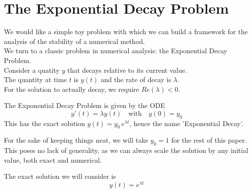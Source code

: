 \section{The Exponential Decay Problem}

\par We would like a simple toy problem with which we can build a framework for the analysis of the stability of a numerical method.\\
We turn to a classic problem in numerical analysis: the Exponential Decay Problem.\\
Consider a quatity $y$ that decays relative to its current value.\\
The quantity at time $t$ is $y(t)$ and the rate of decay is $\lambda$.\\
For the solution to actually decay, we require $Re(\lambda) < 0$.\\

\par The Exponential Decay Problem is given by the ODE
\[y'(t) = \lambda y(t) \quad \text{with} \quad y(0) = y_0\]
This has the exact solution $y(t) = y_0\, e^{\lambda t}$, hence the name 'Exponential Decay'.\\

\par For the sake of keeping things neat, we will take $y_0 = 1$ for the rest of this paper.\\
This poses no lack of generality, as we can always scale the solution by any initial value, both exact and numerical.\\

\par The exact solution we will consider is \[y(t) = e^{\lambda t}\]\\


